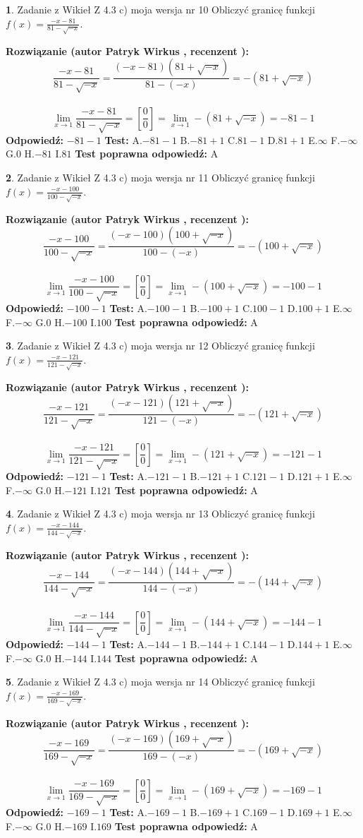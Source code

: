\documentclass[12pt, a4paper]{article}
\theoremstyle{definition} %
\newtheorem{zad}{}
\newcommand{\zadStart}[1]{\begin{zad}#1\newline}
\newcommand{\zadStop}{\end{zad}}
\newcommand{\rozwStart}[2]{\noindent \textbf{Rozwiązanie (autor #1 , recenzent #2): }\newline}
\newcommand{\rozwStop}{\newline}
\newcommand{\odpStart}{\noindent \textbf{Odpowiedź:}\newline}
\newcommand{\odpStop}{\newline}
\newcommand{\testStart}{\noindent \textbf{Test:}\newline}
\newcommand{\testStop}{\newline}
\newcommand{\kluczStart}{\noindent \textbf{Test poprawna odpowiedź:}\newline}
\newcommand{\kluczStop}{\newline}
\begin{document}
\zadStart{Zadanie z Wikieł Z 4.3 c) moja wersja nr 10}
Obliczyć granicę funkcji $f(x)=\frac{-x-81}{81-\sqrt{-x}}$.
\zadStop
\rozwStart{Patryk Wirkus}{}
$$\frac{-x-81}{81-\sqrt{-x}}=\frac{(-x-81)(81+\sqrt{-x})}{81-(-x)}=-(81+\sqrt{-x})$$
\\
$$\lim\limits_{x\to1}\frac{-x-81}{81-\sqrt{-x}}=[\frac{0}{0}]=\lim\limits_{x\to1}-(81+\sqrt{-x}) =-81-1$$
\rozwStop
\odpStart
$-81-1$
\odpStop
\testStart
A.$-81-1$
B.$-81+1$
C.$81-1$
D.$81+1$
E.$\infty$
F.$-\infty$
G.$0$
H.$-81$
I.$81$
\testStop
\kluczStart
A
\kluczStop



\zadStart{Zadanie z Wikieł Z 4.3 c) moja wersja nr 11}
Obliczyć granicę funkcji $f(x)=\frac{-x-100}{100-\sqrt{-x}}$.
\zadStop
\rozwStart{Patryk Wirkus}{}
$$\frac{-x-100}{100-\sqrt{-x}}=\frac{(-x-100)(100+\sqrt{-x})}{100-(-x)}=-(100+\sqrt{-x})$$
\\
$$\lim\limits_{x\to1}\frac{-x-100}{100-\sqrt{-x}}=[\frac{0}{0}]=\lim\limits_{x\to1}-(100+\sqrt{-x}) =-100-1$$
\rozwStop
\odpStart
$-100-1$
\odpStop
\testStart
A.$-100-1$
B.$-100+1$
C.$100-1$
D.$100+1$
E.$\infty$
F.$-\infty$
G.$0$
H.$-100$
I.$100$
\testStop
\kluczStart
A
\kluczStop



\zadStart{Zadanie z Wikieł Z 4.3 c) moja wersja nr 12}
Obliczyć granicę funkcji $f(x)=\frac{-x-121}{121-\sqrt{-x}}$.
\zadStop
\rozwStart{Patryk Wirkus}{}
$$\frac{-x-121}{121-\sqrt{-x}}=\frac{(-x-121)(121+\sqrt{-x})}{121-(-x)}=-(121+\sqrt{-x})$$
\\
$$\lim\limits_{x\to1}\frac{-x-121}{121-\sqrt{-x}}=[\frac{0}{0}]=\lim\limits_{x\to1}-(121+\sqrt{-x}) =-121-1$$
\rozwStop
\odpStart
$-121-1$
\odpStop
\testStart
A.$-121-1$
B.$-121+1$
C.$121-1$
D.$121+1$
E.$\infty$
F.$-\infty$
G.$0$
H.$-121$
I.$121$
\testStop
\kluczStart
A
\kluczStop



\zadStart{Zadanie z Wikieł Z 4.3 c) moja wersja nr 13}
Obliczyć granicę funkcji $f(x)=\frac{-x-144}{144-\sqrt{-x}}$.
\zadStop
\rozwStart{Patryk Wirkus}{}
$$\frac{-x-144}{144-\sqrt{-x}}=\frac{(-x-144)(144+\sqrt{-x})}{144-(-x)}=-(144+\sqrt{-x})$$
\\
$$\lim\limits_{x\to1}\frac{-x-144}{144-\sqrt{-x}}=[\frac{0}{0}]=\lim\limits_{x\to1}-(144+\sqrt{-x}) =-144-1$$
\rozwStop
\odpStart
$-144-1$
\odpStop
\testStart
A.$-144-1$
B.$-144+1$
C.$144-1$
D.$144+1$
E.$\infty$
F.$-\infty$
G.$0$
H.$-144$
I.$144$
\testStop
\kluczStart
A
\kluczStop



\zadStart{Zadanie z Wikieł Z 4.3 c) moja wersja nr 14}
Obliczyć granicę funkcji $f(x)=\frac{-x-169}{169-\sqrt{-x}}$.
\zadStop
\rozwStart{Patryk Wirkus}{}
$$\frac{-x-169}{169-\sqrt{-x}}=\frac{(-x-169)(169+\sqrt{-x})}{169-(-x)}=-(169+\sqrt{-x})$$
\\
$$\lim\limits_{x\to1}\frac{-x-169}{169-\sqrt{-x}}=[\frac{0}{0}]=\lim\limits_{x\to1}-(169+\sqrt{-x}) =-169-1$$
\rozwStop
\odpStart
$-169-1$
\odpStop
\testStart
A.$-169-1$
B.$-169+1$
C.$169-1$
D.$169+1$
E.$\infty$
F.$-\infty$
G.$0$
H.$-169$
I.$169$
\testStop
\kluczStart
A
\kluczStop
\end{document}
